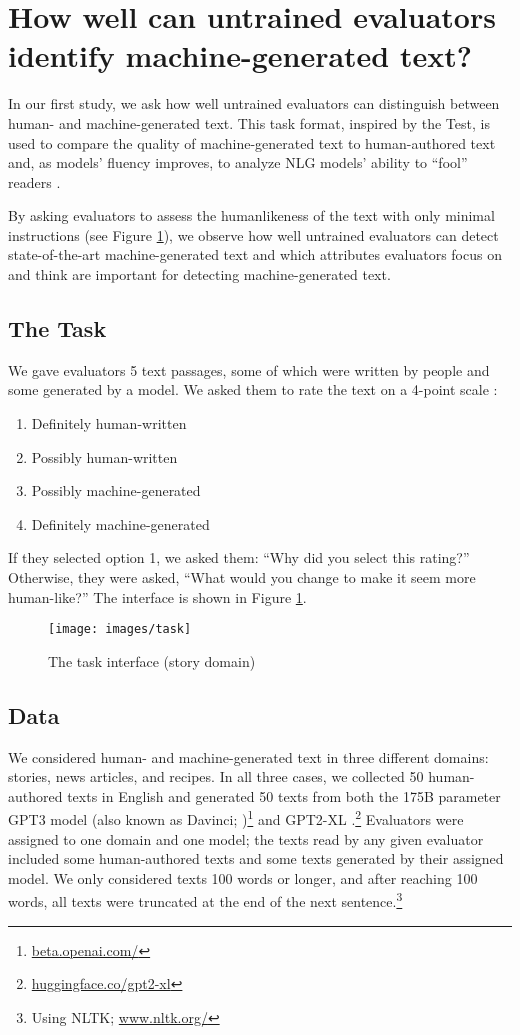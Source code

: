 \section{How well can untrained evaluators identify machine-generated text?}\label{sec:exp_1}
In our first study, we ask how well untrained evaluators can distinguish between human- and machine-generated text.
This task format, inspired by the \citet{turing_test} Test, is used to compare the quality of machine-generated text to human-authored text and, as models' fluency improves, to analyze NLG models' ability to ``fool'' readers \citep{garbacea-etal-2019-judge,ippolito-etal-2020-automatic,gpt3}. 

By asking evaluators to assess the humanlikeness of the text
with only minimal instructions (see Figure \ref{fig:task}),
we observe how well untrained evaluators can detect state-of-the-art machine-generated text and which attributes evaluators focus on and think are important for detecting machine-generated text.

\subsection{The Task}
We gave evaluators 5 text passages, some of which were written by people and some generated by a model.
We asked them to rate the text on a 4-point scale \citep{ippolito-etal-2020-automatic}:
\begin{enumerate}[noitemsep]
    \item Definitely human-written
    \item Possibly human-written
    \item Possibly machine-generated
    \item Definitely machine-generated
\end{enumerate}
If they selected option 1, we asked them: ``Why did you select this rating?'' Otherwise, they were asked, ``What would you change to make it seem more human-like?''
The interface is shown in Figure \ref{fig:task}.

\begin{figure}[ht]
\centering
\texttt{[image: images/task]}
\caption{The task interface (story domain)}
\label{fig:task}
\end{figure}

\subsection{Data}\label{sec:data}
We considered human- and machine-generated text in three different domains: stories, news articles, and recipes. In all three cases, we collected 50 human-authored texts in English and generated 50 texts from both the 175B parameter GPT3 model (also known as Davinci; \citealp{gpt3})\footnote{\url{beta.openai.com/}} and GPT2-XL \citep{gpt2}.\footnote{\url{huggingface.co/gpt2-xl}}
Evaluators were assigned to one domain and one model; the texts read by any given evaluator included some human-authored texts and some texts generated by their assigned model.
We only considered texts 100 words or longer,
and after reaching 100 words, all texts were truncated at the end of the next sentence.\footnote{Using NLTK; \url{www.nltk.org/}}

